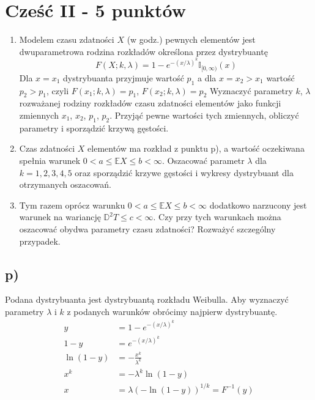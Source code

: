 \documentclass{article}
\begin{document}
\section{Cześć II - 5 punktów}
\setcounter{enumii}{16}
\begin{enumerate}[label = \alph{enumii})]
\item Modelem czasu zdatności $X$ (w godz.) pewnych elementów jest dwuparametrowa
rodzina rozkładów określona przez dystrybuantę
\[ F(X;k,\lambda) = 1 - e^{-(x/\lambda)^k} \mathbb{I}_{[0,\infty)}(x) \]
Dla $x = x_1$ dystrybuanta przyjmuje wartość $p_1$ a dla $x = x_2 > x_1$ wartość $p_2 > p_1$,
czyli
$F(x_1;k,\lambda) = p_1$, $F(x_2;k,\lambda) = p_2$
Wyznaczyć parametry $k$, $\lambda$ rozważanej rodziny rozkładów czasu zdatności elementów
jako funkcji zmiennych $x_1$, $x_2$, $p_1$, $p_2$. Przyjąć pewne wartości tych zmiennych, obliczyć
parametry i sporządzić krzywą gęstości.
\setcounter{enumii}{17}
\item Czas zdatności $X$ elementów ma rozkład z punktu p), a wartość oczekiwana spełnia
warunek $0 < a \leq \mathbb{E}X \leq b < \infty$. Oszacować parametr $\lambda$ dla $k = 1, 2, 3, 4, 5$ oraz
sporządzić krzywe gęstości i wykresy dystrybuant dla otrzymanych oszacowań.
\setcounter{enumii}{18}
\item Tym razem oprócz warunku $0 < a \leq \mathbb{E}X \leq b < \infty$ dodatkowo narzucony jest
warunek na wariancję $\mathbb{D}^2T \leq c < \infty$. Czy przy tych warunkach można oszacować
obydwa parametry czasu zdatności? Rozważyć szczególny przypadek. 
\end{enumerate}

\newpage
\subsection{p)}
Podana dystrybuanta jest dystrybuantą rozkładu Weibulla. Aby wyznaczyć parametry $\lambda$ i $k$ z podanych warunków obrócimy najpierw dystrybuantę.
\begin{align*}
y & = 1 - e^{-(x/\lambda)^k} \\
1 - y & = e^{-(x/\lambda)^k}\\
\ln{(1-y)} & = -\frac{x^k}{\lambda^k} \\
x^k &= -\lambda^k \ln{(1-y)} \\
x &= \lambda (-\ln{(1-y)})^{1/k} = F^{-1}(y)
\end{align*}
\end{document}

